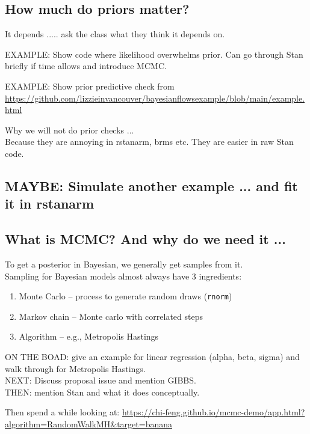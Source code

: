 \documentclass[11pt]{article}
\begin{document}
\subsection{How much do priors matter?}
It depends ..... ask the class what they think it depends on.


EXAMPLE: Show code where likelihood overwhelms prior. Can go through Stan briefly if time allows and introduce MCMC. 

EXAMPLE: Show prior predictive check from \url{https://github.com/lizzieinvancouver/bayesianflowsexample/blob/main/example.html} 

Why we will not do prior checks ... \\ Because they are annoying in rstanarm, brms etc. They are easier in raw Stan code. 

\subsection{MAYBE: Simulate another example ... and fit it in rstanarm} 

\subsection{What is MCMC? And why do we need it ...}

To get a posterior in Bayesian, we generally get samples from it. \\
Sampling for Bayesian models almost always have 3 ingredients:

\begin{enumerate}
\item Monte Carlo -- process to generate random draws (\verb|rnorm|)
\item Markov chain -- Monte carlo with correlated steps
\item Algorithm -- e.g., Metropolis Hastings
\end{enumerate}

ON THE BOAD: give an example for linear regression (alpha, beta, sigma) and walk through for Metropolis Hastings. \\
NEXT: Discuss proposal issue and mention GIBBS.\\
THEN: mention Stan and what it does conceptually. 

Then spend a while looking at: \url{https://chi-feng.github.io/mcmc-demo/app.html?algorithm=RandomWalkMH&target=banana}
\end{document}
